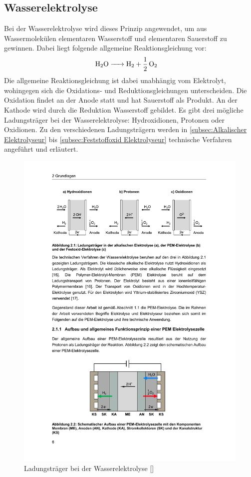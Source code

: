 \subsection{Wasserelektrolyse}
\label{subsec:Elektrolyse} 
Bei der Wasserelektrolyse wird dieses Prinzip angewendet, um aus Wassermolekülen elementaren Wasserstoff und elementaren Sauerstoff zu gewinnen. Dabei liegt folgende allgemeine Reaktionsgleichung vor:   
\begin{align}
	\label{gl:Reaktionsgleichung}
	\ce{ H2O &-> H2 + 1/2O2}
\end{align}
Die allgemeine Reaktionsgleichung ist dabei unabhängig vom Elektrolyt, wohingegen sich die Oxidations- und Reduktionsgleichungen unterscheiden. Die Oxidation findet an der Anode statt und hat Sauerstoff als Produkt. An der Kathode wird durch die Reduktion Wasserstoff gebildet. Es gibt drei mögliche Ladungsträger bei der Wasserelektrolyse: Hydroxidionen, Protonen oder Oxidionen. Zu den verschiedenen Ladungsträgern werden in  \ref{subsec:Alkalischer Elektrolyseur} bis \ref{subsec:Feststoffoxid Elektrolyseur} technische Verfahren angeführt und erläutert.
\begin{figure}[h]
	\centering
		\includegraphics[scale=1]{Figures/LadungstraegerBeiDerWasserelektrolyse}
		\caption{Ladungsträger bei der 
		Wasserelektrolyse [\cite{ISBN 978-3-95806-217-7}]}
\label{fig:LadungstraegerBeiDerWasserelektrolyse}	
\end{figure}

